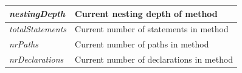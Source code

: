 \begin{table}[]
\begin{tabular}{@{}ll@{}}
		\textit{nestingDepth}         & Current nesting depth of method                                                                                                        \\ \midrule
		\textit{totalStatements}      & Current number of statements in method                                                                                                 \\ \midrule
		\textit{nrPaths}              & Current number of paths in method                                                                                                      \\ \midrule
		\textit{nrDeclarations}       & Current number of declarations in method                            \\\midrule 
	\end{tabular}
\end{table}


%
%


